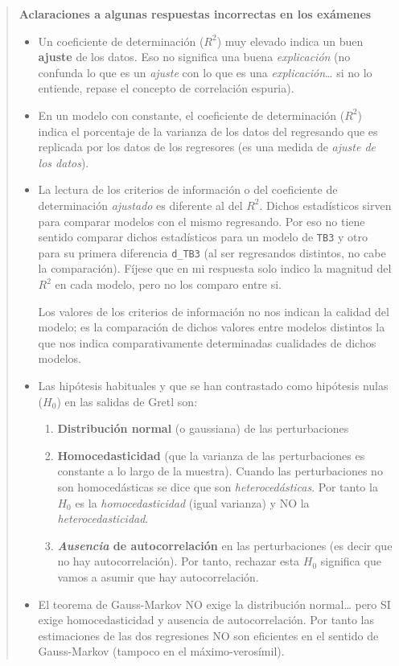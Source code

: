 \documentclass[10pt]{article}
\begin{document}
\begin{quote}
\textbf{Aclaraciones a algunas respuestas incorrectas en los exámenes}

\begin{itemize}
\item Un coeficiente de determinación (\(R^2\)) muy elevado indica un buen
\textbf{ajuste} de los datos. Eso no significa una buena \emph{explicación} (no
confunda lo que es un \emph{ajuste} con lo que es una \emph{explicación}\ldots{} si
no lo entiende, repase el concepto de correlación espuria).
\item En un modelo con constante, el coeficiente de determinación (\(R^2\))
indica el porcentaje de la varianza de los datos del regresando que
es replicada por los datos de los regresores (es una medida de
\emph{ajuste de los datos}).
\item La lectura de los criterios de información o del coeficiente de
determinación \emph{ajustado} es diferente al del \(R^2\). Dichos
estadísticos sirven para comparar modelos con el mismo
regresando. Por eso no tiene sentido comparar dichos estadísticos
para un modelo de \texttt{TB3} y otro para su primera diferencia \texttt{d\_TB3}
(al ser regresandos distintos, no cabe la comparación). Fíjese que
en mi respuesta solo indico la magnitud del \(R^2\) en cada modelo,
pero no los comparo entre si.

Los valores de los criterios de información no nos indican la
calidad del modelo; es la comparación de dichos valores entre
modelos distintos la que nos indica comparativamente determinadas
cualidades de dichos modelos.

\item Las hipótesis habituales y que se han contrastado como hipótesis
nulas (\(H_0\)) en las salidas de Gretl son:
\begin{enumerate}
\item \textbf{Distribución normal} (o gaussiana) de las perturbaciones
\item \textbf{Homocedasticidad} (que la varianza de las perturbaciones es
constante a lo largo de la muestra). Cuando las perturbaciones no
son homocedásticas se dice que son \emph{heterocedásticas}. Por tanto
la \(H_0\) es la \emph{homocedasticidad} (igual varianza) y NO la
\emph{heterocedasticidad}.
\item \textbf{\emph{Ausencia} de autocorrelación} en las perturbaciones (es decir
que no hay autocorrelación). Por tanto, rechazar esta \(H_0\)
significa que vamos a asumir que hay autocorrelación.
\end{enumerate}
\item El teorema de Gauss-Markov NO exige la distribución normal\ldots{} pero
SI exige homocedasticidad y ausencia de autocorrelación. Por tanto
las estimaciones de las dos regresiones NO son eficientes en el
sentido de Gauss-Markov (tampoco en el máximo-verosímil).
\end{itemize}
\end{quote}
\end{document}
